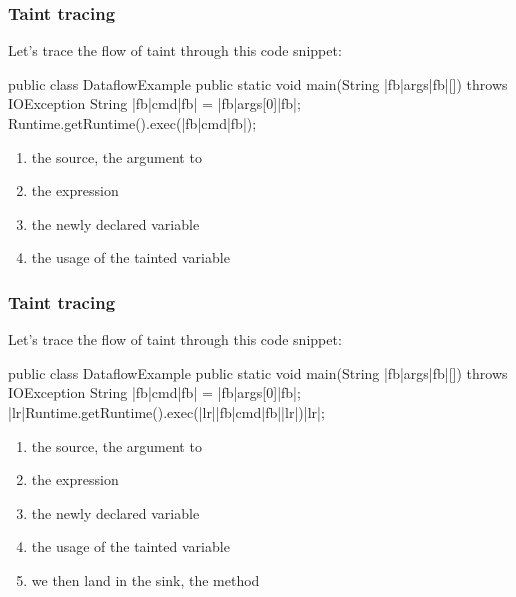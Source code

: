 \documentclass[aspectratio=169, handout]{beamer}
\begin{document}
\begin{frame}[fragile]
  \frametitle{Taint tracing}

  \begin{minipage}[t][1.6in][t]{\textwidth}
    Let's trace the flow of taint through this code snippet:

    \begin{pythoncodeblock}[language=java]
      public class DataflowExample {
        public static void main(String |fb|args|fb|[]) throws IOException {
          String |fb|cmd|fb| = |fb|args[0]|fb|;
          Runtime.getRuntime().exec(|fb|cmd|fb|);
        }
      }
    \end{pythoncodeblock}
  \end{minipage}
  \begin{minipage}[t][1in][t]{\textwidth}
    \begin{enumerate}
      \item the {\color{sourceColor}source}, the  argument to 
      \item the expression 
      \item the newly declared variable 
      \item the usage of the tainted variable 
    \end{enumerate}
  \end{minipage}
\end{frame}

\begin{frame}[fragile]
  \frametitle{Taint tracing}

  \begin{minipage}[t][1.6in][t]{\textwidth}
    Let's trace the flow of taint through this code snippet:

    \begin{pythoncodeblock}[language=java]
      public class DataflowExample {
        public static void main(String |fb|args|fb|[]) throws IOException {
          String |fb|cmd|fb| = |fb|args[0]|fb|;
          |lr|Runtime.getRuntime().exec(|lr||fb|cmd|fb||lr|)|lr|;
        }
      }
    \end{pythoncodeblock}
  \end{minipage}
  \begin{minipage}[t][1in][t]{\textwidth}
    \begin{enumerate}
      \item the {\color{sourceColor}source}, the  argument to 
      \item the expression 
      \item the newly declared variable 
      \item the usage of the tainted variable 
      \item we then land in the {\color{sinkColor}sink}, the  method
    \end{enumerate}
  \end{minipage}
\end{frame}
\end{document}
